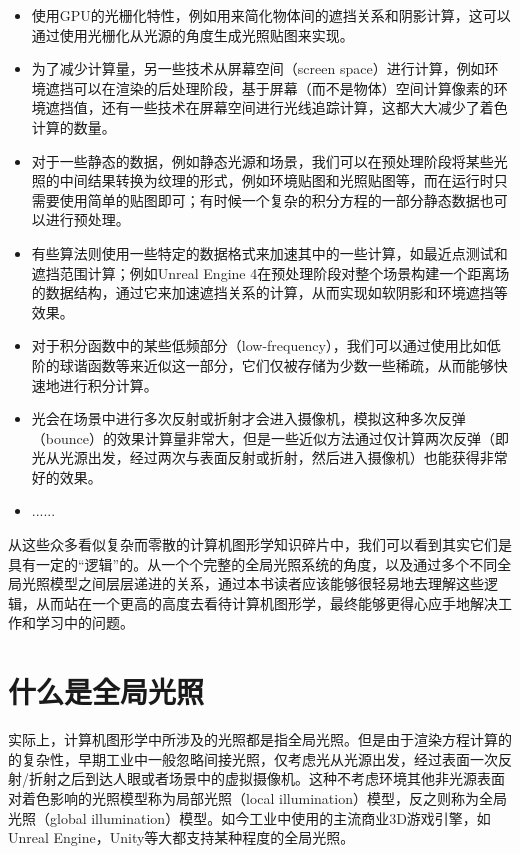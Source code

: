 \begin{itemize}
	\item 使用GPU的光栅化特性，例如用来简化物体间的遮挡关系和阴影计算，这可以通过使用光栅化从光源的角度生成光照贴图来实现。
	\item 为了减少计算量，另一些技术从屏幕空间（screen space）进行计算，例如环境遮挡可以在渲染的后处理阶段，基于屏幕（而不是物体）空间计算像素的环境遮挡值，还有一些技术在屏幕空间进行光线追踪计算，这都大大减少了着色计算的数量。
	\item 对于一些静态的数据，例如静态光源和场景，我们可以在预处理阶段将某些光照的中间结果转换为纹理的形式，例如环境贴图和光照贴图等，而在运行时只需要使用简单的贴图即可；有时候一个复杂的积分方程的一部分静态数据也可以进行预处理。 
	\item 有些算法则使用一些特定的数据格式来加速其中的一些计算，如最近点测试和遮挡范围计算；例如Unreal Engine 4在预处理阶段对整个场景构建一个距离场的数据结构，通过它来加速遮挡关系的计算，从而实现如软阴影和环境遮挡等效果。
	\item 对于积分函数中的某些低频部分（low-frequency），我们可以通过使用比如低阶的球谐函数等来近似这一部分，它们仅被存储为少数一些稀疏，从而能够快速地进行积分计算。
	\item 光会在场景中进行多次反射或折射才会进入摄像机，模拟这种多次反弹（bounce）的效果计算量非常大，但是一些近似方法通过仅计算两次反弹（即光从光源出发，经过两次与表面反射或折射，然后进入摄像机）也能获得非常好的效果。
	\item ......
\end{itemize}

从这些众多看似复杂而零散的计算机图形学知识碎片中，我们可以看到其实它们是具有一定的“逻辑”的。从一个个完整的全局光照系统的角度，以及通过多个不同全局光照模型之间层层递进的关系，通过本书读者应该能够很轻易地去理解这些逻辑，从而站在一个更高的高度去看待计算机图形学，最终能够更得心应手地解决工作和学习中的问题。




\section{什么是全局光照}
实际上，计算机图形学中所涉及的光照都是指全局光照。但是由于渲染方程计算的的复杂性，早期工业中一般忽略间接光照，仅考虑光从光源出发，经过表面一次反射/折射之后到达人眼或者场景中的虚拟摄像机。这种不考虑环境其他非光源表面对着色影响的光照模型称为局部光照（local illumination）模型，反之则称为全局光照（global illumination）模型。如今工业中使用的主流商业3D游戏引擎，如Unreal Engine，Unity等大都支持某种程度的全局光照。

